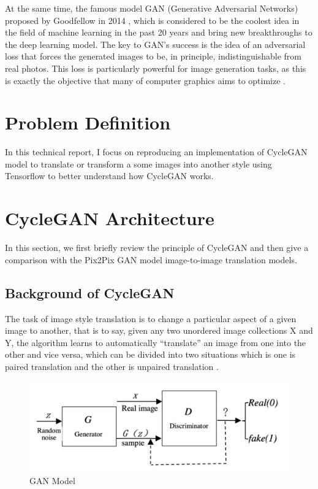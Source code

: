 \documentclass[peerreview]{IEEEtran}
\begin{document}
At the same time, the famous model GAN (Generative Adversarial Networks) proposed by Goodfellow in 2014 \cite{goodfellow2014generative}, which is considered to be the coolest idea in the field of machine learning in the past 20 years and bring new breakthroughs to the deep learning model. The key to GAN's success is the idea of an adversarial loss that forces the generated images to be, in principle, indistinguishable from real photos. This loss is particularly powerful for image generation tasks, as this is exactly the objective that many of computer graphics aims to optimize \cite{zhu2019brief}.


\section{Problem Definition}
In this technical report, I focus on reproducing an implementation of CycleGAN model to translate or transform a some images into another style using Tensorflow to better understand how CycleGAN works.


\section{CycleGAN Architecture}
In this section, we first briefly review the principle of CycleGAN and then give a comparison with the Pix2Pix GAN model image-to-image translation models.

\subsection{Background of CycleGAN}
The task of image style translation is to change a particular aspect of a given image to another, that is to say, given any two unordered image collections X and Y, the algorithm learns to automatically “translate” an image from one into the other and vice versa, which can be divided into two situations which is one is paired translation and the other is unpaired translation \cite{upadhyay2021uncertainty}.

\begin{figure}[H]
    \centering
    \includegraphics[width=0.8\columnwidth]{GAN Model}
    \caption{GAN Model}
    \label{fig:s=gan_model}
\end{figure}
\end{document}

